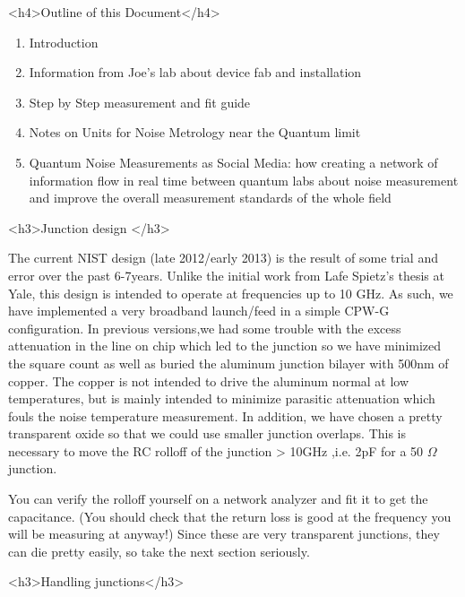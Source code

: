 \documentclass[11pt]{article}
\begin{document}
<h4>Outline of this Document</h4>
\begin{enumerate}

    \item
Introduction
    \item
Information from Joe's lab about device fab and installation
    \item
Step by Step measurement and fit guide
    \item
Notes on Units for Noise Metrology near the Quantum limit
    \item
Quantum Noise Measurements as Social Media: how creating a network of information flow in real time between quantum labs about noise measurement and improve the overall measurement standards of the whole field
\end{enumerate}


<h3>Junction design </h3>



The current NIST design (late 2012/early 2013) is the result of some trial and error over the past 6-7years. Unlike the initial work from Lafe Spietz’s thesis at Yale, this design is intended to operate at frequencies up to 10 GHz. As such, we have implemented a very broadband launch/feed in a simple CPW-G conﬁguration. In previous versions,we had some trouble with the excess attenuation in the line on chip which led to the junction so we have minimized the square count as well as buried the aluminum junction bilayer with 500nm of copper. The copper is not intended to drive the aluminum normal at low temperatures, but is mainly intended to minimize parasitic attenuation which fouls the noise temperature measurement. In addition, we have chosen a pretty transparent oxide so that we could use smaller junction overlaps. This is necessary to move the RC rolloff of the junction > 10GHz ,i.e. 2pF for a 50 $\Omega$ junction.




    
You can verify the rolloff yourself on a network analyzer and ﬁt it to get the capacitance. (You should check that the return loss is good at the frequency you will be measuring at anyway!) Since these are very transparent junctions, they can die pretty easily, so take the next section seriously.





<h3>Handling junctions</h3>
\end{document}
